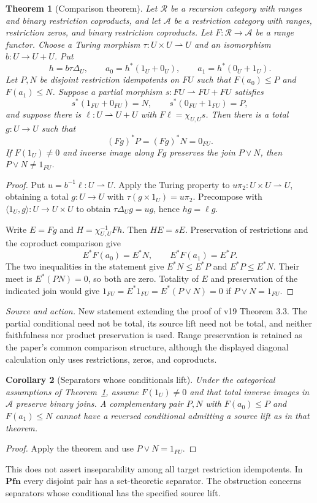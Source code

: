 \documentclass[11pt]{article}
\newtheorem{theorem}{Theorem}[section]
\newtheorem{corollary}[theorem]{Corollary}
\theoremstyle{definition}\newtheorem{definition}[theorem]{Definition}
\newcommand{\Pfn}{\mathbf{Pfn}}
\newcommand{\R}{\mathscr R}
\newcommand{\A}{\mathcal A}
\newcommand{\source}[1]{\par\smallskip\noindent\textit{Source and action.} #1\par\smallskip}
\begin{document}
\begin{theorem}[Comparison theorem]\label{thm:comparison}
Let $\R$ be a recursion category with ranges and binary restriction
coproducts, and let $\A$ be a restriction category with ranges,
restriction zeros, and binary restriction coproducts. Let
$F:\R\to\A$ be a range functor. Choose a Turing morphism
$\tau:U\times U\rightharpoonup U$ and an isomorphism
$b:U\to U+U$. Put
\[
 h=b\tau\Delta_U,\qquad
 a_0=h^*(1_U+0_U),\qquad a_1=h^*(0_U+1_U).
\]
Let $P,N$ be disjoint restriction idempotents on $FU$ such that
$F(a_0)\le P$ and $F(a_1)\le N$. Suppose a partial morphism
$s:FU\rightharpoonup FU+FU$ satisfies
\[
 s^*(1_{FU}+0_{FU})=N,\qquad
 s^*(0_{FU}+1_{FU})=P,
\]
and suppose there is $\ell:U\rightharpoonup U+U$ with
$F\ell=\chi_{U,U}s$.
Then there is a total $g:U\to U$ such that
\[
 (Fg)^*P=(Fg)^*N=0_{FU}.
\]
If $F(1_U)\ne0$ and inverse image along $Fg$ preserves the join
$P\vee N$, then $P\vee N\ne1_{FU}$.
\end{theorem}
\begin{proof}
Put $u=b^{-1}\ell:U\rightharpoonup U$. Apply the Turing property
to $u\pi_2:U\times U\rightharpoonup U$, obtaining a total
$g:U\to U$ with $\tau(g\times1_U)=u\pi_2$.
Precompose with $\langle1_U,g\rangle:U\to U\times U$ to obtain
$\tau\Delta_Ug=ug$, hence $hg=\ell g$.

Write $E=Fg$ and $H=\chi_{U,U}^{-1}Fh$. Then $HE=sE$.
Preservation of restrictions and the coproduct comparison give
\[
 E^*F(a_0)=E^*N,\qquad E^*F(a_1)=E^*P.
\]
The two inequalities in the statement give $E^*N\le E^*P$
and $E^*P\le E^*N$. Their meet is
$E^*(PN)=0$, so both are zero. Totality of $E$ and preservation
of the indicated join would give
$1_{FU}=E^*1_{FU}=E^*(P\vee N)=0$ if $P\vee N=1_{FU}$.
\end{proof}
\source{New statement extending the proof of v19 Theorem 3.3. The partial conditional need not be total, its source lift need not be total, and neither faithfulness nor product preservation is used. Range preservation is retained as the paper's common comparison structure, although the displayed diagonal calculation only uses restrictions, zeros, and coproducts.}

\begin{corollary}[Separators whose conditionals lift]\label{cor:separator}
Under the categorical assumptions of Theorem~\ref{thm:comparison},
assume $F(1_U)\ne0$ and that total inverse images in $\A$ preserve
binary joins. A complementary pair $P,N$ with
$F(a_0)\le P$ and $F(a_1)\le N$ cannot have a reversed conditional
admitting a source lift as in that theorem.
\end{corollary}
\begin{proof}
Apply the theorem and use $P\vee N=1_{FU}$.
\end{proof}
This does not assert inseparability among all target restriction
idempotents. In $\Pfn$ every disjoint pair has a set-theoretic
separator. The obstruction concerns separators whose conditional has
the specified source lift.
\end{document}
